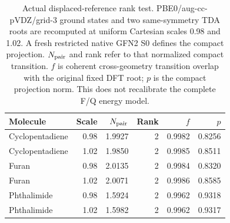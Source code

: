 \begin{table}[!htbp]
\centering\small
\caption{Actual displaced-reference rank test. PBE0/aug-cc-pVDZ/grid-3 ground states and two same-symmetry TDA roots are recomputed at uniform Cartesian scales 0.98 and 1.02. A fresh restricted native GFN2 S0 defines the compact projection. $N_{\rm pair}$ and rank refer to that normalized compact transition. $f$ is coherent cross-geometry transition overlap with the original fixed DFT root; $p$ is the compact projection norm. This does not recalibrate the complete F/Q energy model.}\label{tab:actualanchorrank}
\begin{tabular}{lrrrrr}
\toprule
Molecule & Scale & $N_{\rm pair}$ & Rank & $f$ & $p$ \\
\midrule
Cyclopentadiene & 0.98 & 1.9927 & 2 & 0.9982 & 0.8256 \\
Cyclopentadiene & 1.02 & 1.9850 & 2 & 0.9985 & 0.8511 \\
Furan & 0.98 & 2.0135 & 2 & 0.9984 & 0.8320 \\
Furan & 1.02 & 2.0071 & 2 & 0.9986 & 0.8585 \\
Phthalimide & 0.98 & 1.5924 & 2 & 0.9962 & 0.9318 \\
Phthalimide & 1.02 & 1.5982 & 2 & 0.9962 & 0.9317 \\
\bottomrule
\end{tabular}
\end{table}
